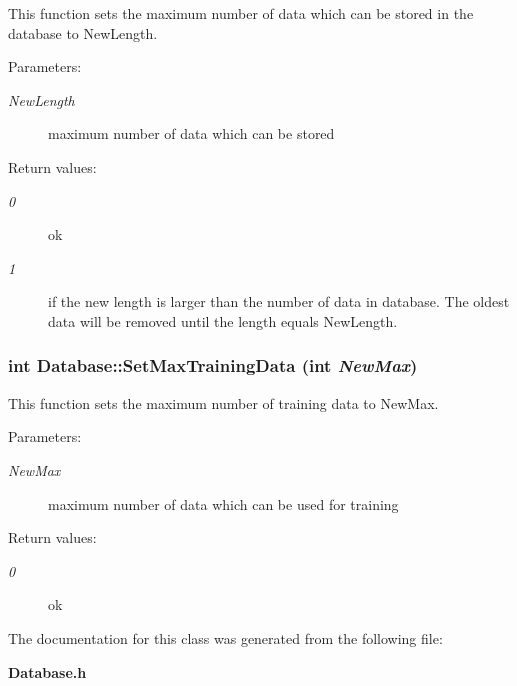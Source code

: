 This function sets the maximum number of data which can be stored in the database to New\-Length.

\begin{Desc}
\item[Parameters: ]\par
\begin{description}
\item[{\em 
New\-Length}]maximum number of data which can be stored \end{description}
\end{Desc}
\begin{Desc}
\item[Return values: ]\par
\begin{description}
\item[{\em 
0}]ok \item[{\em 
1}]if the new length is larger than the number of data in database. The oldest data will be removed until the length equals New\-Length. \end{description}
\end{Desc}
\subsubsection{\setlength{\rightskip}{0pt plus 5cm}int Database::Set\-Max\-Training\-Data (int {\em New\-Max})}\label{classDatabase_a16}


This function sets the maximum number of training data to New\-Max.

\begin{Desc}
\item[Parameters: ]\par
\begin{description}
\item[{\em 
New\-Max}]maximum number of data which can be used for training \end{description}
\end{Desc}
\begin{Desc}
\item[Return values: ]\par
\begin{description}
\item[{\em 
0}]ok \end{description}
\end{Desc}


The documentation for this class was generated from the following file:\begin{CompactItemize}
\item 
{\bf Database.h}\end{CompactItemize}
